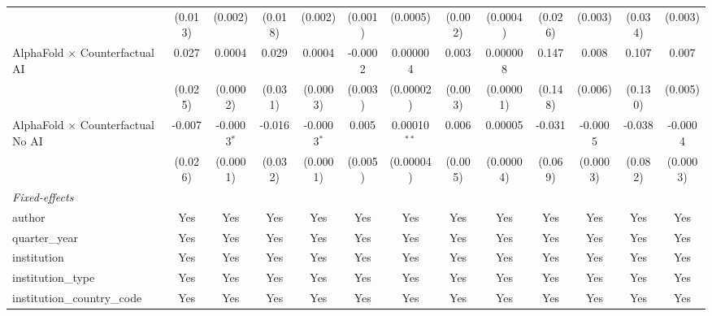 \begin{tabular}{lcccccccccccc}
                                            & (0.013)       & (0.002)       & (0.018)       & (0.002)       & (0.001)      & (0.0005)       & (0.002) & (0.0004)  & (0.026)      & (0.003)       & (0.034)      & (0.003)\\   
   AlphaFold $\times$ Counterfactual AI     & 0.027         & 0.0004        & 0.029         & 0.0004        & -0.0002      & 0.000004       & 0.003   & 0.000008  & 0.147        & 0.008         & 0.107        & 0.007\\   
                                            & (0.025)       & (0.0002)      & (0.031)       & (0.0003)      & (0.003)      & (0.00002)      & (0.003) & (0.00001) & (0.148)      & (0.006)       & (0.130)      & (0.005)\\   
   AlphaFold $\times$ Counterfactual No AI  & -0.007        & -0.0003$^{*}$ & -0.016        & -0.0003$^{*}$ & 0.005        & 0.00010$^{**}$ & 0.006   & 0.00005   & -0.031       & -0.0005       & -0.038       & -0.0004\\   
                                            & (0.026)       & (0.0001)      & (0.032)       & (0.0001)      & (0.005)      & (0.00004)      & (0.005) & (0.00004) & (0.069)      & (0.0003)      & (0.082)      & (0.0003)\\   
   \midrule
   \emph{Fixed-effects}\\
   author                                   & Yes           & Yes           & Yes           & Yes           & Yes          & Yes            & Yes     & Yes       & Yes          & Yes           & Yes          & Yes\\  
   quarter\_year                            & Yes           & Yes           & Yes           & Yes           & Yes          & Yes            & Yes     & Yes       & Yes          & Yes           & Yes          & Yes\\  
   institution                              & Yes           & Yes           & Yes           & Yes           & Yes          & Yes            & Yes     & Yes       & Yes          & Yes           & Yes          & Yes\\  
   institution\_type                        & Yes           & Yes           & Yes           & Yes           & Yes          & Yes            & Yes     & Yes       & Yes          & Yes           & Yes          & Yes\\  
   institution\_country\_code               & Yes           & Yes           & Yes           & Yes           & Yes          & Yes            & Yes     & Yes       & Yes          & Yes           & Yes          & Yes\\  

\end{tabular}
